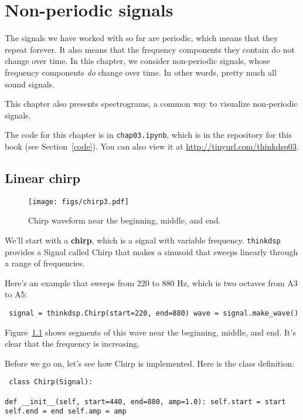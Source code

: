 \documentclass[12pt]{book} \usepackage[width=5.5in,height=8.5in, hmarginratio=3:2,vmarginratio=1:1]{geometry}
\begin{document}
\chapter{Non-periodic signals} \label{nonperiodic} 

The signals we have worked with so far are periodic, which means that they repeat forever. It also means that the frequency components they contain do not change over time. In this chapter, we consider non-periodic signals, whose frequency components {\em do} change over time. In other words, pretty much all sound signals. 

This chapter also presents spectrograms, a common way to visualize non-periodic signals. 

The code for this chapter is in {\tt chap03.ipynb}, which is in the repository for this book (see Section~\ref{code}). You can also view it at \url{http://tinyurl.com/thinkdsp03}. 

\section{Linear chirp} 

\begin{figure} 

\centerline{\texttt{[image: figs/chirp3.pdf]}} \caption{Chirp waveform near the beginning, middle, and end.} \label{fig.chirp3} \end{figure} 

We'll start with a {\bf chirp}, which is a signal with variable frequency. {\tt thinkdsp} provides a Signal called Chirp that makes a sinusoid that sweeps linearly through a range of frequencies. 

Here's an example that sweeps from 220 to 880 Hz, which is two octaves from A3 to A5: 

\begin{verbatim} signal = thinkdsp.Chirp(start=220, end=880) wave = signal.make_wave() \end{verbatim} 

Figure~\ref{fig.chirp3} shows segments of this wave near the beginning, middle, and end. It's clear that the frequency is increasing. 

Before we go on, let's see how Chirp is implemented. Here is the class definition: 

\begin{verbatim} class Chirp(Signal): 

def __init__(self, start=440, end=880, amp=1.0): self.start = start self.end = end self.amp = amp \end{verbatim} 
\end{document}
